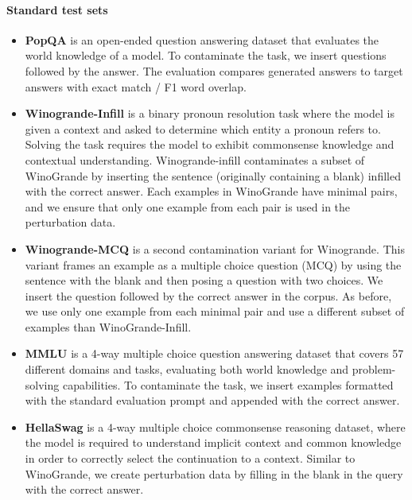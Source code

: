 \paragraph{Standard test sets}
\begin{itemize}
    \item {} \textbf{PopQA} \citep{mallen-etal-2023-trust} is an open-ended question answering dataset that evaluates the world knowledge of a model. To contaminate the task, we insert questions followed by the answer. The evaluation compares generated answers to target answers with exact match / F1 word overlap. 
    
    \item {} \textbf{Winogrande-Infill} \citep{sakaguchi_2021_winogrande} is a binary  pronoun resolution task where the model is given a context and asked to determine which entity a pronoun refers to. Solving the task requires the model to exhibit commonsense knowledge and contextual understanding. Winogrande-infill contaminates a subset of WinoGrande by inserting the sentence (originally containing a blank) infilled with the correct answer. Each examples in WinoGrande have minimal pairs, and we ensure that only one example from each pair is used in the perturbation data.

    \item {} \textbf{Winogrande-MCQ} is a second contamination variant for Winogrande. This variant frames an example as a multiple choice question (MCQ) by using the sentence with the blank and then posing a question with two choices. We insert the question followed by the correct answer in the corpus. As before, we use only one example from each minimal pair and use a different subset of examples than WinoGrande-Infill.

    \item {} \textbf{MMLU} \citep{hendrycks2021measuring} is a 4-way multiple choice question answering dataset that covers 57 different domains and tasks, evaluating both world knowledge and problem-solving capabilities. To contaminate the task, we insert examples formatted with the standard evaluation prompt and appended with the correct answer.
    
    \item {} \textbf{HellaSwag} \citep{zellers-etal-2019-hellaswag} is a 4-way multiple choice commonsense reasoning dataset, where the model is required to understand implicit context and common knowledge in order to correctly select the continuation to a context. Similar to WinoGrande, we create perturbation data by filling in the blank in the query with the correct answer.
    

\end{itemize}
